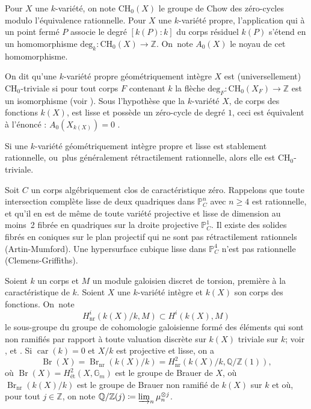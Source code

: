 \documentclass[11pt]{article}
\newcommand{\CH}{\mathrm{CH}}
\theoremstyle{definition}
\newcommand{\Q}{\mathbb Q}
\newcommand{\Z}{\mathbb Z}
\renewcommand{\P}{\mathbb P}
\newcommand{\on}[1]{\operatorname{#1}}
\begin{document}
\medskip

Pour $X$ une $k$-variété, on note $\CH_{0}(X)$ le groupe de Chow des zéro-cycles modulo l'équivalence rationnelle.
Pour $X$ une $k$-variété propre, l'application qui à un point fermé $P$
associe le degré $[k(P):k]$ du corps résiduel $k(P)$ s'étend en un homomorphisme
$ \mathrm{deg}_{k} \colon \CH_{0}(X) \to \Z$. On~note $A_{0}(X)$ le noyau de cet homomorphisme.

On dit qu'une $k$-variété propre géométriquement intègre $X$ est (universellement) $\CH_{0}$-triviale si pour tout corps $F$ contenant $k$
la flèche $ \mathrm{deg}_{F} \colon \CH_{0}(X_{F}) \to \Z$ est un isomorphisme
(voir \cite{auel2017universal, colliot2016hypersurfaces}).
Sous l'hypothèse que la $k$-variété $X$, de corps des fonctions $k(X)$, est lisse et
possède un zéro-cycle de degré $1$, ceci est équivalent à l'énoncé : $A_{0}(X_{k(X)})=0$ \cite[Lem.\,1.3]{auel2017universal}.

Si une $k$-variété géométriquement intègre propre et lisse est stablement rationnelle, ou~plus généralement rétractilement rationnelle, alors elle est $\CH_{0}$-triviale.

Soit $C$ un corps algébriquement clos de caractéristique zéro.
Rappelons que toute intersection complète lisse de deux quadriques dans $\P^n_C$ avec $n \geq 4$ est rationnelle,
et qu'il en est de même de toute variété projective et lisse de dimension au moins~2 fibrée en quadriques sur la droite projective $\P^1_C$. Il existe des solides fibrés en coniques sur le plan projectif qui ne sont pas rétractilement rationnels (Artin-Mumford).
Une hypersurface cubique lisse dans $\P^4_C$ n'est pas rationnelle (Clemens-Griffiths).

Soient $k$ un corps et $M$ un module galoisien discret de torsion, première à la caractéristique de $k$.
Soient
$X$ une $k$-variété intègre et $k(X)$
son corps des fonctions. On~note \[
H^{i}_{\on{nr}}(k(X)/k, M) \subset H^{i}(k(X),M)
\]
le sous-groupe du groupe de cohomologie galoisienne
formé des éléments qui sont non ramifiés par rapport à toute valuation discrète sur $k(X)$ triviale sur $k$; voir \hbox{\cite[\S 4]{colliot1995birational}}, \cite{rost1996chow} et \cite{merkurjev2008unramified}.
Si $\on{car}(k)=0$ et $X/k$ est projective et lisse, on a
\[\on{Br}(X)=\on{Br}_{\on{nr}}(k(X)/k)=H^2_{\on{nr}}(k(X)/k,\Q/\Z(1)),\]
où $\on{Br}(X)=H^2_{\text{ét}}(X,\mathbb{G}_m)$ est le groupe de Brauer de $X$, où $\on{Br}_{\on{nr}}(k(X)/k)$ est le groupe de Brauer non ramifié de $k(X)$ sur $k$ et où, pour tout $j\in \Z$, on note $\Q/\Z(j)\coloneqq \varinjlim_n \mu_n^{\otimes j}$.
\end{document}
